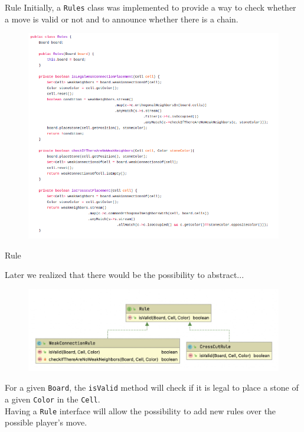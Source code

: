 \documentclass{beamer}
\begin{document}
\begin{frame}{Rule}
	Initially, a \texttt{Rules} class was implemented to provide a way to check whether a move is valid or not and to announce whether there is a chain.
	\begin{figure}
		\includegraphics[scale=0.28]{images/rules-class.png}
	\end{figure}
\end{frame}

\begin{frame}{Rule}
	
	Later we realized that there would be the possibility to abstract...
	\begin{figure}
		\includegraphics[scale=0.4]{images/rules-uml.jpg}
	\end{figure}

	For a given \texttt{Board}, the \texttt{isValid} method will check if it is legal to place a stone of a given \texttt{Color} in the \texttt{Cell}. \\
	\vspace{0.1cm}
	Having a \texttt{Rule} interface will allow the possibility to add new rules over the possible player's move.
	
\end{frame}
\end{document}
